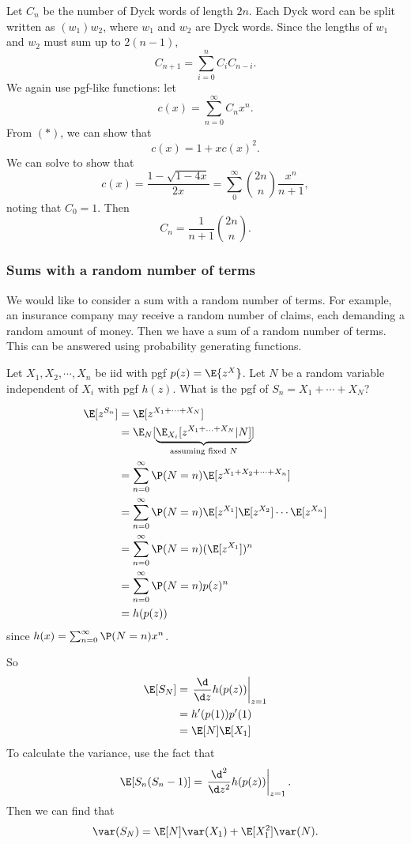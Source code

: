 \documentclass[a4paper]{article}
\begin{document}
Let $C_n$ be the number of Dyck words of length $2n$. Each Dyck word can be split written as $(w_1)w_2$, where $w_1$ and $w_2$ are Dyck words. Since the lengths of $w_1$ and $w_2$ must sum up to $2(n -1)$,
\[
  C_{n + 1} = \sum_{i = 0}^n C_iC_{n - i}.\tag{*}
\]
We again use pgf-like functions: let
\[
  c(x) = \sum_{n = 0}^\infty C_n x^n.
\]
From $(*)$, we can show that
\[
  c(x) = 1 + xc(x)^2.
\]
We can solve to show that
\[
  c(x) = \frac{1 - \sqrt{1 - 4x}}{2x} = \sum_0^\infty \binom{2n}{n}\frac{x^n}{n + 1},
\]
noting that $C_0 = 1$. Then
\[
  C_n = \frac{1}{n + 1}\binom{2n}{n}.
\]

\subsubsection*{Sums with a random number of terms}
We would like to consider a sum with a random number of terms. For example, an insurance company may receive a random number of claims, each demanding a random amount of money. Then we have a sum of a random number of terms. This can be answered using probability generating functions.

\begin{eg}
Let $X_1, X_2, \cdots, X_n$ be iid with pgf $p(z) = \E{z^X}$. Let $N$ be a random variable independent of $X_i$ with pgf $h(z)$. What is the pgf of $S_n = X_1 + \cdots + X_N$?

\begin{align*}
  \E[z^{S_n}] &= \E[z^{X_1 + \cdots + X_N}]\\
  &= \E_N[\underbrace{\E_{X_i}[z^{X_1 + \ldots + X_N}|N]}_{\text{assuming fixed }N}]\\
  &= \sum_{n = 0}^\infty \P(N = n) \E[z^{X_1 + X_2 + \cdots + X_n}]\\
  &= \sum_{n = 0}^\infty \P(N = n) \E[z^{X_1}] \E[z^{X_2}]\cdots\E[z^{X_n}]\\
  &= \sum_{n = 0}^\infty \P(N = n) (\E[z^{X_1}])^n\\
  &= \sum_{n = 0}^\infty \P(N = n) p(z)^n \\
  &= h(p(z))
\end{align*}
since $h(x) = \sum_{n = 0}^\infty \P(N = n) x^n$.

So
\begin{align*}
  \E[S_N] &= \left.\frac{\d }{\d z}h(p(z))\right|_{z = 1}\\
  &= h'(p(1))p'(1)\\
  &= \E[N]\E[X_1]
\end{align*}
To calculate the variance, use the fact that
\[
  \E[S_n(S_n - 1)] = \left.\frac{\d ^2}{\d z^2}h(p(z))\right|_{z = 1}.
\]
Then we can find that
\[
  \var (S_N) = \E[N]\var(X_1) + \E[X_1^2]\var(N).
\]
\end{eg}
\end{document}
